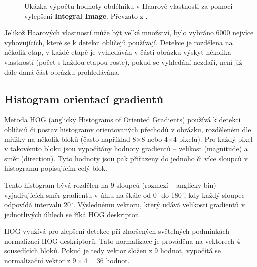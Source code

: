 \begin{figure}[H]
  \begin{center}
  \label{integralimage}
  \caption{Ukázka výpočtu hodnoty obdélníku v Haarově vlastnosti za pomoci vylepšení \textbf{Integral Image}. Převzato z \cite{violaJonesArticle}.}
  \end{center}
\end{figure}

Jelikož Haarových vlastností může být velké množství, bylo vybráno 6000 nejvíce vyhovujících, které se k detekci obličejů používají. Detekce je rozdělena na několik etap, v každé etapě je vyhledáván v části obrázku výskyt několika vlastností (počet s každou etapou roste), pokud se vyhledání nezdaří, není již dále daná část obrázku prohledávána. 


\subsection*{Histogram orientací gradientů}
Metoda HOG (anglicky Histograms of Oriented Gradients) \cite{hog, hog2} používá k detekci obličejů či postav histogramy orientovaných přechodů v obrázku, rozděleném dle mřížky na několik bloků (často například 8$\times$8 nebo 4$\times$4 pixelů). Pro každý pixel v takovémto bloku jsou vypočítány hodnoty gradientů -- velikost (magnitude) a směr (direction). Tyto hodnoty jsou pak přiřazeny do jednoho či více sloupců v histogramu popisujícím celý blok.

Tento histogram bývá rozdělen na 9 sloupců (rozmezí -- anglicky bin) vyjadřujících směr gradientu v úhlu na škále od 0$^\circ$ do 180$^\circ$, kdy každý sloupec odpovídá intervalu 20$^\circ$. Výslednému vektoru, který udává velikosti gradientů v jednotlivých úhlech se říká HOG deskriptor.

HOG využívá pro zlepšení detekce při zhoršených světelných podmínkách normalizaci HOG deskriptorů. Tato normalizace je prováděna na vektorech 4 sousedících bloků. Pokud je tedy vektor složen z 9 hodnot, vypočítá se normalizační vektor z $9 \times 4 = 36$ hodnot.

